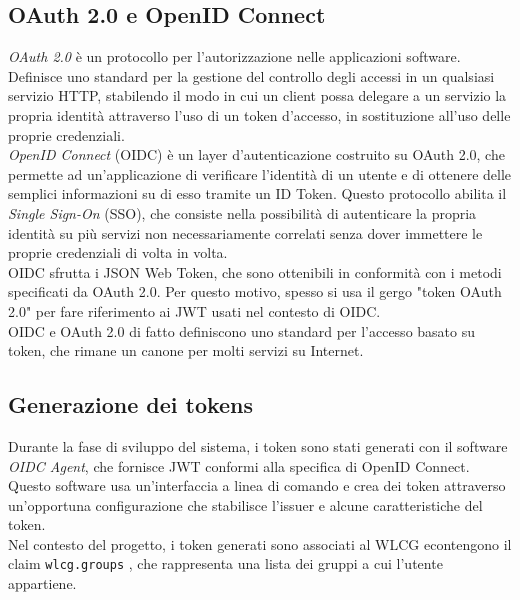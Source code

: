 \subsection{OAuth 2.0 e OpenID Connect}
\textit{OAuth 2.0} \cite{oauth_rfc} è un protocollo per l'autorizzazione nelle applicazioni software. Definisce uno standard per la gestione del controllo degli accessi
in un qualsiasi servizio HTTP, stabilendo il modo in cui un client possa delegare a un servizio la propria identità attraverso l'uso di un token d'accesso, in sostituzione all'uso delle proprie credenziali. 
\\ \textit{OpenID Connect} (OIDC) \cite{oidc_doc} è un layer d'autenticazione costruito su OAuth 2.0, che permette ad un'applicazione di 
verificare l'identità di un utente e di ottenere delle semplici informazioni su di esso tramite un ID Token. Questo protocollo abilita il \textit{Single Sign-On} (SSO), 
che consiste nella possibilità di autenticare la propria identità su più servizi non necessariamente correlati senza dover immettere le proprie credenziali di volta in volta. 
\\OIDC sfrutta i JSON Web Token, che sono ottenibili in conformità con i metodi specificati da OAuth 2.0. Per questo motivo, spesso si usa il gergo
"token OAuth 2.0" per fare riferimento ai JWT usati nel contesto di OIDC.  
\\OIDC e OAuth 2.0 di fatto definiscono uno standard per l'accesso basato su token, che rimane un canone per molti servizi su Internet.

\subsection{Generazione dei tokens}
Durante la fase di sviluppo del sistema, i token sono stati generati con il software \textit{OIDC Agent}, che fornisce JWT conformi alla specifica di OpenID Connect.
Questo software usa un'interfaccia a linea di comando e crea dei token attraverso un'opportuna configurazione che stabilisce l'issuer e alcune caratteristiche del token.
\\ Nel contesto del progetto, i token generati sono associati al WLCG econtengono il claim \texttt{wlcg.groups} \cite{wlcg_jwt}, che rappresenta una lista dei gruppi a cui l'utente appartiene. 

